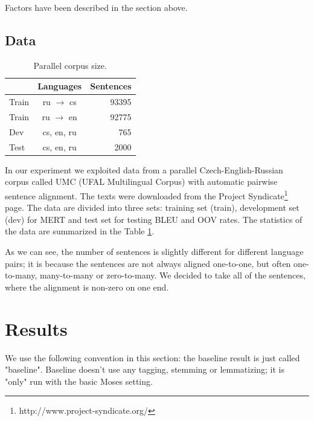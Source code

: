 \documentclass[11pt,letterpaper]{article}
\begin{document}
Factors have been described in the section above.

\subsection{Data}
\begin{table}

\begin{center}
\begin{tabular}{lcr}
  &  Languages & Sentences \\
\hline
Train & ru $\rightarrow$ cs &  93395\\
Train & ru $\rightarrow$ en &  92775\\ \hline %
Dev & cs, en, ru          &    765 \\
Test  & cs, en, ru          &  2000 \\
\hline
\end{tabular}
\end{center}
\caption{Parallel corpus size.}
\label{tab:corpus}
\end{table}

In our experiment we exploited data from a parallel Czech-English-Russian
corpus called UMC (UFAL Multilingual Corpus) with automatic pairwise sentence
alignment. The texts were downloaded from the Project
Syndicate\footnote{http://www.project-syndicate.org/} page. 
The data are divided into three sets: training set (train),
development set (dev) for MERT and test set for testing BLEU and OOV rates.
The statistics of the data are summarized in the Table \ref{tab:corpus}.

As we can see, the number of sentences is slightly different for different language pairs; it is because the sentences are not always aligned one-to-one, but often one-to-many, many-to-many or zero-to-many. We decided to take all of the sentences, where the alignment is non-zero on one end. 

\section{Results}

We use the following convention in this section: the baseline result is just called "baseline". Baseline doesn't use any tagging, stemming or lemmatizing; it is "only" run with the basic Moses setting.
\end{document}
